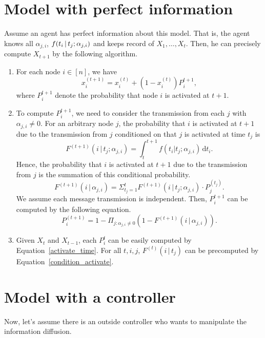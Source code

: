 \documentclass[11pt]{article}
\begin{document}
\section{Model with perfect information}
Assume an agent has perfect information about this model. That is, the agent knows all $\alpha_{j,i}$, $f(t_{i}\,|\, t_{j} ; \alpha_{j,i})$ and keeps record of $X_{1}, \dots , X_{t}$. Then, he can precisely compute $X_{t+1}$ by the following algorithm.
\begin{enumerate}
\item For each node $i \in [n]$, we have 
\begin{equation}\label{activate_time}
x_{i}^{(t+1)} = x_{i}^{(t)} + (1-x_{i}^{(t)})P_{i}^{t+1},
\end{equation}
where $P_{i}^{t+1}$ denote the probability that node $i$ is activated at $t+1$.
\item To compute $P_{i}^{t+1}$, we need to consider the transmission from each $j$ with $\alpha_{j,i}\neq 0$. For an arbitrary node $j$, the probability that $i$ is activated at $t+1$ due to the transmission from $j$ conditioned on that $j$ is activated at time $t_{j}$ is 
\begin{equation}\label{condition_activate}
F^{(t+1)} (i\,|\,t_{j}; \alpha_{j,i}) = \int_t^{t+1} \! f(t_{i}|t_{j}; \alpha_{j,i}) \, \mathrm{d}t_{i}.
\end{equation}
Hence, the probability that $i$ is activated at $t+1$ due to the transmission from $j$ is the summation of this conditional probability.
\begin{equation}
 F^{(t+1)}(i\,|\,\alpha_{j,i}) = \Sigma_{t_j=1}^{t} F^{(t+1)} (i\,|\,t_{j}; \alpha_{j,i}) \cdot P_{j}^{(t_{j})}.
 \end{equation}
 We assume each message transmission is independent. Then, $P_{i}^{t+1}$ can be computed by the following equation.
\begin{equation} 
P_{i}^{(t+1)} = 1- \Pi_{j: \alpha_{j,i} \neq 0} (1- F^{(t+1)}(i\,|\,\alpha_{j,i})).
\end{equation}
\item Given $X_{t}$ and $X_{t-1}$, each $P_{i}^{t}$ can be easily computed by Equation~\ref{activate_time}. For all $t, i, j$, $F^{(t)} (i\,|\,t_{j})$ can be precomputed by Equation~\ref{condition_activate}.
\end{enumerate}
\section{Model with a controller}
Now, let's assume there is an outside controller who wants to manipulate the information diffusion. 
\end{document}

